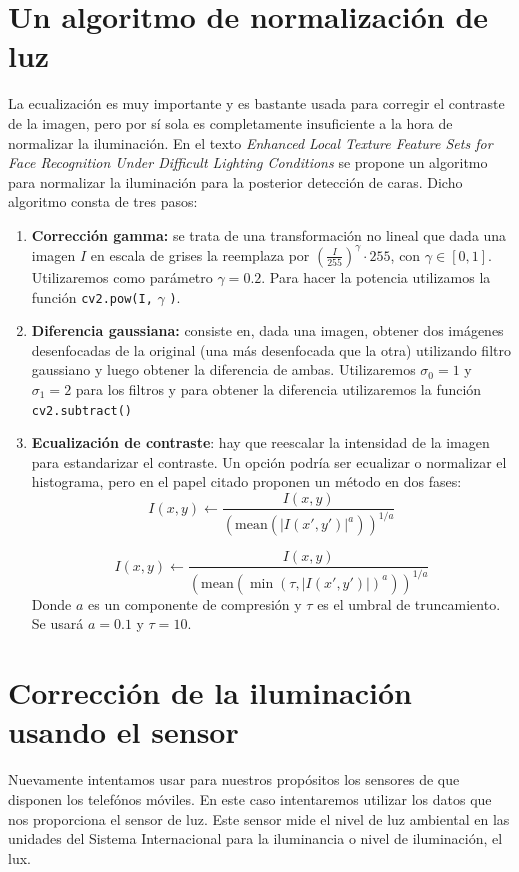 \documentclass[a4paper,openright, 12pt]{book}
\begin{document}
\section{Un algoritmo de normalización de luz}
La ecualización es muy importante y es bastante usada para corregir el contraste de la imagen, pero por sí sola es completamente insuficiente a la hora de normalizar la iluminación. En el texto \textit{Enhanced Local Texture Feature Sets for Face Recognition Under Difficult Lighting Conditions} \cite{illuFace} se propone un algoritmo para normalizar la iluminación para la posterior detección de caras.
\newline
Dicho algoritmo consta de tres pasos:
\begin{enumerate}
\item \textbf{Corrección gamma:} 
se trata de una transformación no lineal que dada una imagen $I$ en escala de grises la reemplaza por ${(\frac{I}{255})}^{\gamma}\cdot255$, con $\gamma \in [0,1]$. Utilizaremos como parámetro $\gamma = 0.2$. Para hacer la potencia utilizamos la función \lstinline|cv2.pow(I,| $\gamma$ \lstinline|)|.

\item \textbf{Diferencia gaussiana:} consiste en, dada una imagen, obtener dos imágenes desenfocadas de la original (una más desenfocada que la otra) utilizando filtro gaussiano y luego obtener la diferencia de ambas. Utilizaremos $\sigma_0 =1$ y $\sigma_1=2$ para los filtros y para obtener la diferencia utilizaremos la función \lstinline|cv2.subtract()|

\item \textbf{Ecualización de contraste}: hay que reescalar la intensidad de la imagen para estandarizar el contraste. Un opción podría ser ecualizar o normalizar el histograma, pero en el papel citado proponen un método en dos fases:
\begin{equation}
I(x,y) \leftarrow \frac{I(x,y)}{ {(\text{mean}(|I(x',y')|^a))}^{1/a}}
\end{equation}

\begin{equation}
I(x,y) \leftarrow \frac{I(x,y)}{ {(\text{mean}({\min(\tau, |I(x',y')|)}^a))}^{1/a}}
\end{equation}
Donde $a$ es un componente de compresión y $\tau$ es el umbral de truncamiento. Se usará $a=0.1$ y $\tau=10$.
\end{enumerate}

\section{Corrección de la iluminación usando el sensor}
Nuevamente intentamos usar para nuestros propósitos los sensores de que disponen los telefónos móviles. En este caso intentaremos utilizar los datos que nos proporciona el sensor de luz. Este sensor mide el nivel de luz ambiental en las unidades del Sistema Internacional para la iluminancia o nivel de iluminación, el lux.
\end{document}

